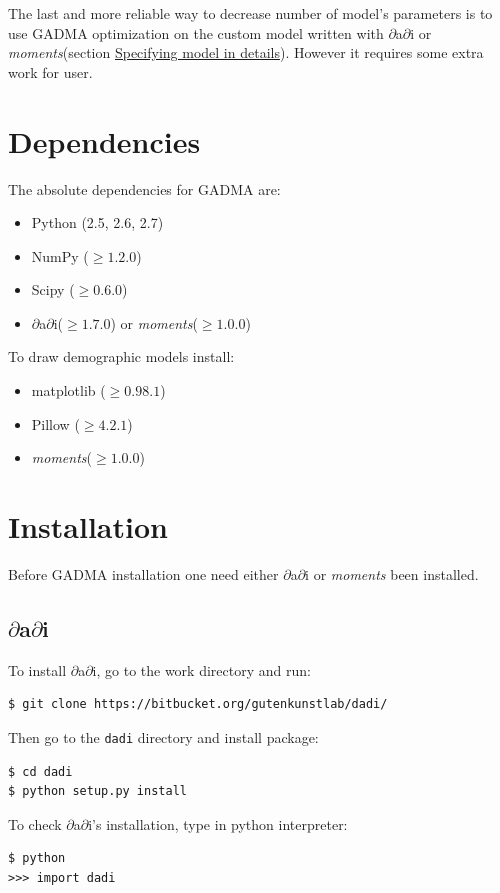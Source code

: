 \documentclass[12pt]{article}
\makeatletter
\newcommand{\dadi}{$\partial$a$\partial$i\xspace}
\newcommand{\moments}{\textit{moments}\xspace}
\newcommand{\py}[1]{\lstinline[language=Python, showstringspaces=False]@#1@}
\makeatother
\begin{document}
The last and more reliable way to decrease number of model's parameters is to use GADMA optimization on the custom model written with \dadi or \moments (section \hyperref[sec:spec-model-in-det]{Specifying model in details}). However it requires some extra work for user.

\newpage
\section{Dependencies}
The absolute dependencies for GADMA are:
\begin{itemize}
    \item Python (2.5, 2.6, 2.7)
    \item NumPy ($\geq 1.2.0$)
    \item Scipy ($\geq 0.6.0$)
    \item \dadi ($\geq 1.7.0$) or \moments ($\geq 1.0.0$)
\end{itemize}

To draw demographic models install:
\begin{itemize}
    \item matplotlib ($\geq 0.98.1$)
    \item Pillow ($\geq 4.2.1$)
    \item \moments ($\geq 1.0.0$)
\end{itemize}


\section{Installation}
Before GADMA installation one need either \dadi or \moments been installed.

\subsection{\dadi}
To install \dadi, go to the work directory and run:

\begin{lstlisting}
$ git clone https://bitbucket.org/gutenkunstlab/dadi/
\end{lstlisting}

Then go to the \py{dadi} directory and install package:

\begin{lstlisting}
$ cd dadi
$ python setup.py install
\end{lstlisting}

To check \dadi's installation, type in python interpreter:

\begin{lstlisting}
$ python
>>> import dadi
\end{lstlisting}
\end{document}
